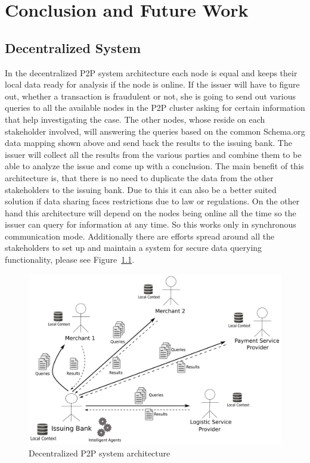 
\chapter{Conclusion and Future Work} %
\label{cha:conclusion}


\section{Decentralized System}
\label{sec:p2p_decentralized_system}

In the decentralized P2P system architecture each node is equal and keeps their local data ready for analysis if the node is online. If the issuer will have to figure out, whether a transaction is fraudulent or not, she is going to send out various queries to all the available nodes in the P2P cluster asking for certain information that help investigating the case. The other nodes, whose reside on each stakeholder involved, will answering the queries based on the common Schema.org data mapping shown above and send back the results to the issuing bank. The issuer will collect all the results from the various parties and combine them to be able to analyze the issue and come up with a conclusion. The main benefit of this architecture is, that there is no need to duplicate the data from the other stakeholders to the issuing bank. Due to this it can also be a better suited solution if data sharing faces restrictions due to law or regulations. On the other hand this architecture will depend on the nodes being online all the time so the issuer can query for information at any time. So this works only in synchronous communication mode. Additionally there are efforts spread around all the stakeholders to set up and maintain a system for secure data querying functionality, please see Figure~\ref{fig:images_p2p_decentralized}.

\begin{figure}[H]
	\centering
		\includegraphics[width=0.8\columnwidth]{images/system_P2P_decentralized.pdf}
	\caption{Decentralized P2P system architecture}
\label{fig:images_p2p_decentralized}
\end{figure}


